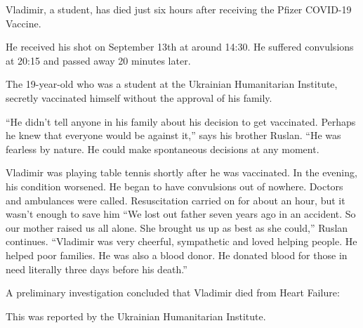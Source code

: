 Vladimir, a student, has died just six hours after receiving the Pfizer COVID-19
Vaccine.

He received his shot on September 13th at around 14:30. He suffered convulsions
at 20:15 and passed away 20 minutes later.

The 19-year-old who was a student at the Ukrainian Humanitarian Institute,
secretly vaccinated himself without the approval of his family.

“He didn’t tell anyone in his family about his decision to get
vaccinated. Perhaps he knew that everyone would be against it,” says his brother
Ruslan. “He was fearless by nature. He could make spontaneous decisions at any
moment.

Vladimir was playing table tennis shortly after he was vaccinated. In the
evening, his condition worsened. He began to have convulsions out of
nowhere. Doctors and ambulances were called. Resuscitation carried on for about
an hour, but it wasn’t enough to save him “We lost out father seven years ago in
an accident. So our mother raised us all alone. She brought us up as best as she
could,” Ruslan continues. “Vladimir was very cheerful, sympathetic and loved
helping people. He helped poor families. He was also a blood donor. He donated
blood for those in need literally three days before his death.”

A preliminary investigation concluded that Vladimir died from Heart Failure:

This was reported by the Ukrainian Humanitarian Institute.

